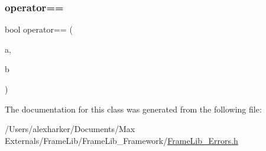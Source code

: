 \mbox{\label{class_frame_lib___error_reporter_1_1_error_list_1_1_const_iterator_adaf71c7726f80ad0a7b8046bc2e1db68}} 
\subsubsection{\texorpdfstring{operator==}{operator==}}
{\footnotesize\ttfamily bool operator== (\begin{DoxyParamCaption}\item[{const \hyperlink{class_frame_lib___error_reporter_1_1_error_list_1_1_const_iterator}{Const\+Iterator} \&}]{a,  }\item[{const \hyperlink{class_frame_lib___error_reporter_1_1_error_list_1_1_const_iterator}{Const\+Iterator} \&}]{b }\end{DoxyParamCaption})\hspace{0.3cm}{\ttfamily [friend]}}



The documentation for this class was generated from the following file\+:\begin{DoxyCompactItemize}
\item 
/\+Users/alexharker/\+Documents/\+Max Externals/\+Frame\+Lib/\+Frame\+Lib\+\_\+\+Framework/\hyperlink{_frame_lib___errors_8h}{Frame\+Lib\+\_\+\+Errors.\+h}\end{DoxyCompactItemize}
